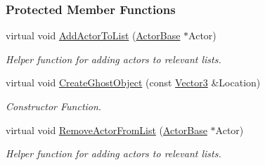 \subsubsection*{Protected Member Functions}
\begin{DoxyCompactItemize}
\item 
\hypertarget{classMezzanine_1_1AreaEffect_a4a81d9d5920f375aa9a5ff27c1de97e0}{
virtual void \hyperlink{classMezzanine_1_1AreaEffect_a4a81d9d5920f375aa9a5ff27c1de97e0}{AddActorToList} (\hyperlink{classMezzanine_1_1ActorBase}{ActorBase} $\ast$Actor)}
\label{classMezzanine_1_1AreaEffect_a4a81d9d5920f375aa9a5ff27c1de97e0}

\begin{DoxyCompactList}\small\item\em Helper function for adding actors to relevant lists. \item\end{DoxyCompactList}\item 
virtual void \hyperlink{classMezzanine_1_1AreaEffect_a198ad58cec706d508785cbd8e319ba54}{CreateGhostObject} (const \hyperlink{classMezzanine_1_1Vector3}{Vector3} \&Location)
\begin{DoxyCompactList}\small\item\em Constructor Function. \item\end{DoxyCompactList}\item 
\hypertarget{classMezzanine_1_1AreaEffect_a676a36ba3fb8b0d7ced951f1b5010852}{
virtual void \hyperlink{classMezzanine_1_1AreaEffect_a676a36ba3fb8b0d7ced951f1b5010852}{RemoveActorFromList} (\hyperlink{classMezzanine_1_1ActorBase}{ActorBase} $\ast$Actor)}
\label{classMezzanine_1_1AreaEffect_a676a36ba3fb8b0d7ced951f1b5010852}

\begin{DoxyCompactList}\small\item\em Helper function for adding actors to relevant lists. \item\end{DoxyCompactList}\end{DoxyCompactItemize}
